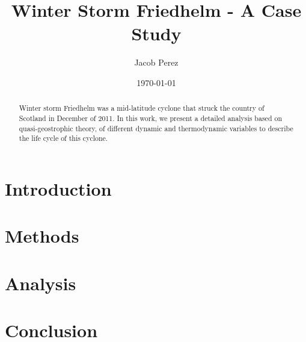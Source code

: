 \documentclass[12pt,a4paper]{article}
\title{\textbf{Winter Storm Friedhelm} - A Case Study}
\date{\today}
\author{Jacob Perez}
\begin{document}
\maketitle
\begin{abstract}
    Winter storm Friedhelm was a mid-latitude cyclone that struck the country of Scotland in December of 2011. In this work, we present a detailed analysis based on quasi-geostrophic theory, of different dynamic and thermodynamic variables to describe the life cycle of this cyclone. 
\end{abstract}
\tableofcontents
\section{Introduction}
\section{Methods}
\section{Analysis}
\section{Conclusion}
\end{document}
